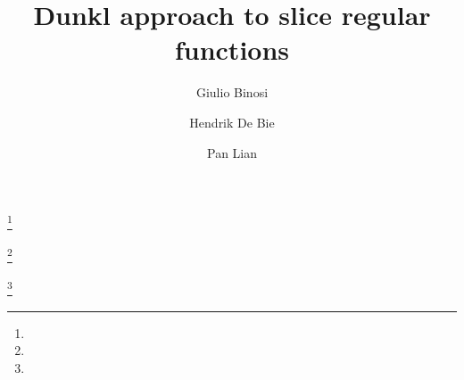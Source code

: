 \documentclass{amsart}
\theoremstyle{definition}
\theoremstyle{remark}
\numberwithin{equation}{section}
\begin{document}
\title[Dunkl approach to slice regular functions]{Dunkl approach to  slice regular functions}

%

\author[G. Binosi]{Giulio Binosi}
\address[1]{Dipartimento di Matematica e Informatica ``U. Dini" \\Universita degli studi di Firenze\\Viale Morgagni 67/A, I-50134 Firenze\\Italy.}
\thanks{}

\author[H. De Bie]{Hendrik De Bie}
\address[2]{Clifford research group \\Department of Electronics and Information Systems \\Faculty of Engineering and Architecture\\Ghent University\\Krijgslaan 281, 9000 Ghent\\ Belgium.}
\curraddr{}
\thanks{}

\author[P. Lian]{Pan Lian}
\address[3]{School of Mathematical Sciences\\ Tianjin Normal University\\
Binshui West Road 393, 300387 Tianjin\\ P.R. China.
}
\curraddr{}
\thanks{}


\end{document}
